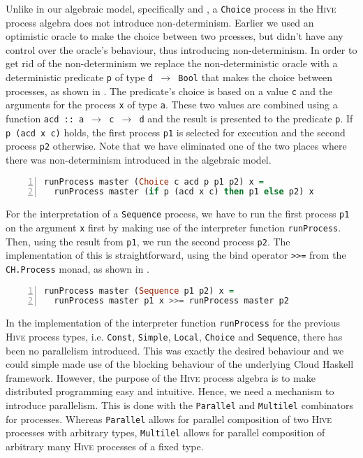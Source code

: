 Unlike in our algebraic model, specifically  and , a \texttt{Choice} process in the \textsc{Hive} process algebra does not introduce non-determinism. Earlier we used an optimistic oracle to make the choice between two prcesses, but didn't have any control over the oracle's behaviour, thus introducing non-determinism. In order to get rid of the non-determinism we replace the non-deterministic oracle with a deterministic predicate \texttt{p} of type \texttt{d $\to$ Bool} that makes the choice between processes, as shown in . The predicate's choice is based on a value \texttt{c} and the arguments for the process \texttt{x} of type \texttt{a}. These two values are combined using a function \texttt{acd :: a $\to$ c $\to$ d} and the result is presented to the predicate \texttt{p}. If \texttt{p (acd x c)} holds, the first process \texttt{p1} is selected for execution and the second process \texttt{p2} otherwise. Note that we have eliminated one of the two places where there was non-determinism introduced in the algebraic model.  %
\begin{lstlisting}[language=Haskell,caption=Implementation of the interpreter for \texttt{Choice} processes.,label=lst:runprocess_choice,numbers=left,frame=bt]
runProcess master (Choice c acd p p1 p2) x =
  runProcess master (if p (acd x c) then p1 else p2) x
\end{lstlisting}

For the interpretation of a \texttt{Sequence} process, we have to run the first process \texttt{p1} on the argument \texttt{x} first by making use of the interpreter function \texttt{runProcess}. Then, using the result from \texttt{p1}, we run the second process \texttt{p2}. The implementation of this is straightforward, using the bind operator \texttt{>}\texttt{>=} from the \texttt{CH.Process} monad, as shown in .
\begin{lstlisting}[language=Haskell,caption=Implementation of the interpreter for \texttt{Sequence} processes.,label=lst:runprocess_sequence,numbers=left,frame=bt]
runProcess master (Sequence p1 p2) x =
  runProcess master p1 x >>= runProcess master p2
\end{lstlisting}

In the implementation of the interpreter function \texttt{runProcess} for the previous \textsc{Hive} process types, i.e. \texttt{Const}, \texttt{Simple}, \texttt{Local}, \texttt{Choice} and \texttt{Sequence}, there has been no parallelism introduced. This was exactly the desired behaviour and we could simple made use of the blocking behaviour of the underlying \textsf{Cloud Haskell} framework. However, the purpose of the \textsc{Hive} process algebra is to make distributed programming easy and intuitive. Hence, we need a mechanism to introduce parallelism. This is done with the \texttt{Parallel} and \texttt{Multilel} combinators for processes. Whereas \texttt{Parallel} allows for parallel composition of two \textsc{Hive} processes with arbitrary types, \texttt{Multilel} allows for parallel composition of arbitrary many \textsc{Hive} processes of a fixed type.

